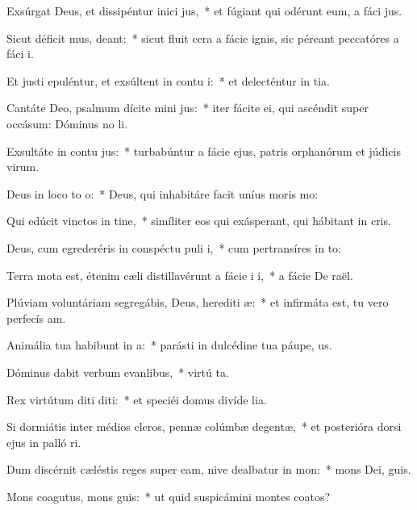 \item Exsúrgat Deus, et dissipéntur inici jus,~* et fúgiant qui odérunt eum, a fáci jus.
\item Sicut déficit mus, deant:~* sicut fluit cera a fácie ignis, sic péreant peccatóres a fáci i.
\item Et justi epuléntur, et exsúltent in contu i:~* et delecténtur in tia.
\item Cantáte Deo, psalmum dícite mini jus:~* iter fácite ei, qui ascéndit super occásum: Dóminus no li.
\item Exsultáte in contu jus:~* turbabúntur a fácie ejus, patris orphanórum et júdicis virum.
\item Deus in loco to o:~* Deus, qui inhabitáre facit uníus moris  mo:
\item Qui edúcit vinctos in tine,~* simíliter eos qui exásperant, qui hábitant in cris.
\item Deus, cum egrederéris in conspéctu puli i,~* cum pertransíres in to:
\item Terra mota est, étenim cæli distillavérunt a fácie i i,~* a fácie De raël.
\item Plúviam voluntáriam segregábis, Deus, herediti æ:~* et infirmáta est, tu vero perfecís am.
\item Animália tua habibunt in a:~* parásti in dulcédine tua páupe, us.
\item Dóminus dabit verbum evanlibus,~* virtú ta.
\item Rex virtútum diti diti:~* et speciéi domus divíde lia.
\item Si dormiátis inter médios cleros, pennæ colúmbæ degentæ,~* et posterióra dorsi ejus in palló ri.
\item Dum discérnit cæléstis reges super eam, nive dealbatur in mon:~* mons Dei,  guis.
\item Mons coagutus, mons guis:~* ut quid suspicámini montes coatos?
